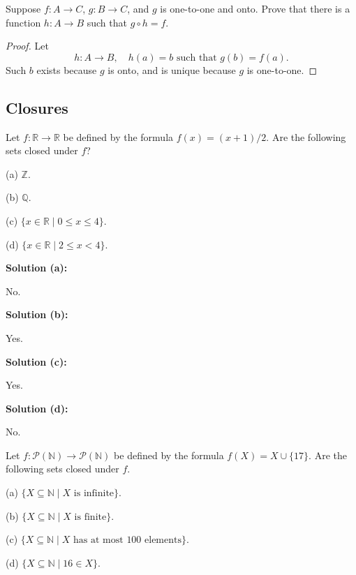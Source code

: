 \begin{tcolorbox}[title=Problem 18, breakable]
    Suppose $f : A \rightarrow C$, $g : B \rightarrow C$, and $g$ is one-to-one and onto.
    Prove that there is a function $h : A \rightarrow B$ such that $g \circ h = f$.
\end{tcolorbox}

\begin{proof}
    Let 
    \[
        h : A \rightarrow B, \quad h(a) = b \text{ such that } g(b) = f(a).
    \]
    Such $b$ exists because $g$ is onto, and is unique because $g$ is one-to-one.
\end{proof}

\subsection{Closures}

\begin{tcolorbox}[title=Problem 1, breakable]
    Let $f : \mathbb{R} \rightarrow \mathbb{R}$
    be defined by the formula $f(x) = (x + 1)/2$.
    Are the following sets closed under $f$?

    (a) $\mathbb{Z}$.

    (b) $\mathbb{Q}$.

    (c) $\{x \in \mathbb{R} \mid 0 \le x \le 4\}$.

    (d) $\{x \in \mathbb{R} \mid 2 \le x < 4\}$.
\end{tcolorbox}

\textbf{Solution (a):}

No.

\textbf{Solution (b):}

Yes.

\textbf{Solution (c):}

Yes.

\textbf{Solution (d):}

No.

\begin{tcolorbox}[title=Problem 2, breakable]
    Let $f : \mathcal{P}(\mathbb{N}) \rightarrow \mathcal{P}(\mathbb{N})$
    be defined by the formula $f(X) = X \cup \{17\}$.
    Are the following sets closed under $f$.

    (a) $\{X \subseteq \mathbb{N} \mid X \text{ is infinite}\}$.

    (b) $\{X \subseteq \mathbb{N} \mid X \text{ is finite}\}$.

    (c) $\{X \subseteq \mathbb{N} \mid X \text{ has at most $100$ elements}\}$.

    (d) $\{X \subseteq \mathbb{N} \mid 16 \in X\}$.
\end{tcolorbox}

